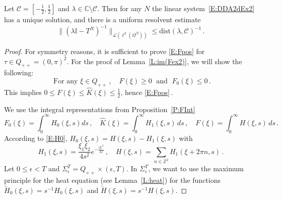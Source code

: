 \documentclass[10pt,a4paper]{amsart}
\let\hat=\widehat
\newcommand {\Id}{\mathbb I}
\newcommand\C{{\mathbb C}}
\newcommand\Z{{\mathbb Z}}
\newcommand\cC{{\mathcal{C}}}
\newcommand\cL{{\mathcal{L}}}
\newcommand{\dist}{\mathrm{dist}}
\begin{document}
\begin{corollary}
 \label{C:stabEX2}
 Let $\cC=[-\frac12,\frac12]$ and $\lambda\in\C\setminus\cC$. Then for any $N$ the linear system~\eqref{E:DDA2dEx2} has a unique solution, and there is a uniform resolvent estimate \begin{equation}
\label{E:ResTNex2}
 \|(\lambda\Id-T^{N})^{-1}\|_{\cL(\ell^{2}(\Omega^{N}))} \le \dist(\lambda,\cC)^{-1}\,.
\end{equation}
\end{corollary}

\begin{proof}
For symmetry reasons, it is sufficient to prove \eqref{E:Fpos} for $\tau\in Q_{++}=(0,\pi)^{2}$.
For the proof of Lemma~\ref{L:im(Fex2)}, we will show the following:
\begin{equation}
\label{E:FposF0neg}
\mbox{ For any }\xi\in Q_{++}\,,\quad
F(\xi)\ge0 \;\mbox{ and } \; F_{0}(\xi)\le0\,.
\end{equation}
This implies $0\le F(\xi)\le \hat K(\xi)\le\frac12$, hence \eqref{E:Fpos}\,.

We use the integral representations from Proposition~\ref{P:FInt}
\begin{equation}
\label{E:F0Int}
 F_{0}(\xi) = \int_{0}^{\infty} H_{0}(\xi,s)ds\,,\quad
 \hat K(\xi) = \int_{0}^{\infty} H_{1}(\xi,s)\,ds\,,\quad
 F(\xi) = \int_{0}^{\infty} H(\xi,s)\,ds\,.
\end{equation}
According to \eqref{E:H0}, $H_{0}(\xi,s)=H(\xi,s)-H_{1}(\xi,s)$ with
\begin{equation}
\label{E:H0H1Ex2}
 H_{1}(\xi,s)= \frac{\xi_{1}\xi_{2}}{4s^{2}} e^{-\frac{|\xi|^{2}}{4s}}\,,\quad
 H(\xi,s)=  \sum_{n\in\Z^{2}} H_{1}(\xi+2\pi n,s)\,.
\end{equation}
Let $0\le\epsilon<T$ and $\Sigma_{\epsilon}^{T}=Q_{++}\times (\epsilon,T)$.
In $\Sigma_{\epsilon}^{T}$, we want to use the maximum principle for the heat equation (see Lemma~\ref{L:heat}) for the functions 
$\tilde H_{0}(\xi,s)=s^{-1}H_{0}(\xi,s)$ and $\tilde H(\xi,s)=s^{-1}H(\xi,s)$. 


\end{proof}
\end{document}
